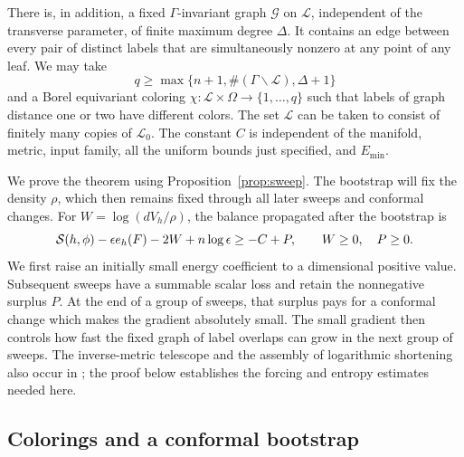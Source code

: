 \begin{theorem}
There is, in addition, a fixed \(\Gamma\)-invariant graph \(\mathcal G\)
on \(\mathcal L\), independent of the transverse parameter, of finite
maximum degree \(\Delta\).  It contains an edge between every pair of
distinct labels that are simultaneously nonzero at any point of any leaf.
We may take
\[
 q\geq \max\{n+1,\#(\Gamma\backslash\mathcal L),\Delta+1\}
\]
and a Borel equivariant coloring
\(\chi:\mathcal L\times\Omega\to\{1,\ldots,q\}\) such that labels of
graph distance one or two have different colors.  The set \(\mathcal L\)
can be taken to consist of finitely many copies of \(\mathcal L_0\).
The constant \(C\) is independent of the manifold, metric, input family,
all the uniform bounds just specified, and \(E_{\min}\).
\end{theorem}

We prove the theorem using Proposition~\ref{prop:sweep}.  The bootstrap
will fix the density \(\rho\), which then remains fixed through all later
sweeps and conformal changes.  For
\(W=\log(dV_h/\rho)\), the balance propagated after the bootstrap is
\[
 \mathcal S(h,\phi)-\epsilon e_h(F)-2W+n\log\epsilon\geq-C+P,
 \qquad W\geq0,\quad P\geq0.
\]
We first raise an initially small energy coefficient to a dimensional
positive value.  Subsequent sweeps have a summable scalar loss and
retain the nonnegative surplus \(P\).  At the end of a group of sweeps,
that surplus pays for a conformal change which makes the gradient
absolutely small.  The small gradient then controls how fast the fixed
graph of label overlaps can grow in the next group of sweeps.
The inverse-metric telescope and the assembly of logarithmic shortening
also occur in \cite[Lemma~6.1 and Theorem~6.3]{OpenAIScalarInessentiality2026};
the proof below establishes the forcing and entropy estimates needed here.

\subsection{Colorings and a conformal bootstrap}

